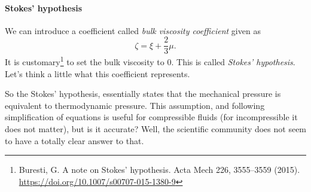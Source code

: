 \documentclass[a4paper]{article}
\begin{document}
\paragraph{Stokes' hypothesis}
We can introduce a coefficient called \emph{bulk viscosity coefficient} given 
as 
\[
  \zeta = \xi + \dfrac{2}{3}\mu.
\]
It is customary\footnote{Buresti, G. A note on Stokes’ hypothesis. Acta Mech 226, 
3555–3559 (2015). \url{https://doi.org/10.1007/s00707-015-1380-9}} to set the 
bulk viscosity to 0. This is called \emph{Stokes' hypothesis}. Let's think a 
little what this coefficient represents.
\begin{quote}
  \footnotemark[\value{footnote}]
\end{quote}
So the Stokes' hypothesis, essentially states that the mechanical pressure is 
equivalent to thermodynamic pressure. This assumption, and following
simplification of equations is useful for compressible fluids (for
incompressible it does not matter), but is it accurate? Well, the scientific 
community does not seem to have a totally clear answer to that. 
\end{document}
